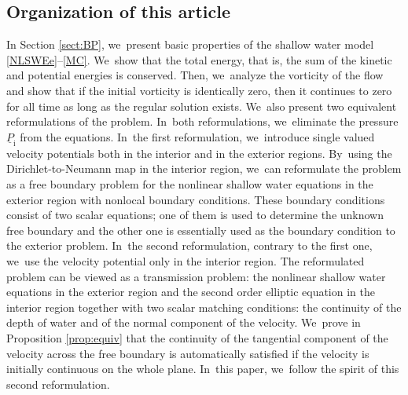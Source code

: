 \documentclass[JEP,XML,SOM,Unicode,NoFloatCountersInSection,published]{cedram}
\newcommand{\ul}[1]{\underline{#1}}
\theoremstyle{definition}
\begin{document}
\subsection{Organization of this article}
In Section \ref{sect:BP}, we~present basic properties of the shallow water model \eqref{NLSWEe}--\eqref{MC}. We~show that the total energy, that is, the sum of the kinetic and potential energies is conserved.
Then, we~analyze the vorticity of the flow and show that if the initial vorticity is identically zero,
then it continues to zero for all time as long as the regular solution exists. We~also present two equivalent reformulations of the problem. In~both reformulations, we~eliminate the pressure $\ul{P}_\mathrm{i}$ from the equations. In~the first reformulation, we~introduce single valued velocity potentials both in the interior and in the exterior regions. By~using the Dirichlet-to-Neumann map in the interior region, we~can reformulate the problem as a free boundary problem for the nonlinear shallow water equations
in the exterior region with nonlocal boundary conditions.
These boundary conditions consist of two scalar equations;
one of them is used to determine the unknown free boundary and the other one is essentially used as the boundary condition to the exterior problem. In~the second reformulation, contrary to the first one, we~use the velocity potential only in the interior region.
The reformulated problem can be viewed as a transmission problem:
the nonlinear shallow water equations in the exterior region and the second order elliptic equation in the interior region
together with two scalar matching conditions: the continuity of the depth of water and of the normal component of the velocity. We~prove in Proposition \ref{prop:equiv} that the continuity of the tangential component of the velocity across the free boundary is automatically satisfied
if the velocity is initially continuous on the whole plane. In~this paper, we~follow the spirit of this second reformulation.
\end{document}
